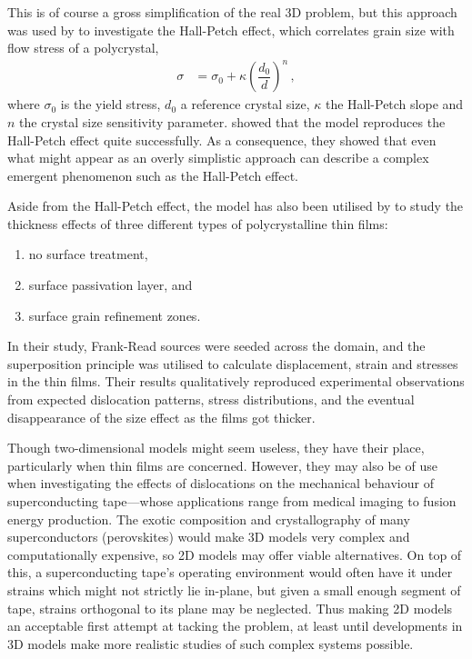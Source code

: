 This is of course a gross simplification of the real 3D problem, but this approach was used by \citet{2d_pcm} to investigate the Hall-Petch effect, which correlates grain size with flow stress of a polycrystal,
\begin{align}\label{eq:hall_petch}
  \sigma & = \sigma_{0} + \kappa \left(\dfrac{d_{0}}{d}\right)^{n}\,,
\end{align}
where $ \sigma_{0} $ is the yield stress, $ d_{0} $ a reference crystal size, $ \kappa $ the Hall-Petch slope and $ n $ the crystal size sensitivity parameter.  showed that the model reproduces the Hall-Petch effect quite successfully. As a consequence, they showed that even what might appear as an overly simplistic approach can describe a complex emergent phenomenon such as the Hall-Petch effect.

Aside from the Hall-Petch effect, the model has also been utilised by \citet{2d_pcm2} to study the thickness effects of three different types of polycrystalline thin films:
\begin{enumerate}
  \item no surface treatment,
  \item surface passivation layer, and
  \item surface grain refinement zones.
\end{enumerate}
In their study, Frank-Read sources were seeded across the domain, and the superposition principle was utilised to calculate displacement, strain and stresses in the thin films. Their results qualitatively reproduced experimental observations from expected dislocation patterns, stress distributions, and the eventual disappearance of the size effect as the films got thicker.

Though two-dimensional models might seem useless, they have their place, particularly when thin films are concerned. However, they may also be of use when investigating the effects of dislocations on the mechanical behaviour of superconducting tape---whose applications range from medical imaging to fusion energy production. The exotic composition and crystallography of many superconductors (perovskites) would make 3D models very complex and computationally expensive, so 2D models may offer viable alternatives. On top of this, a superconducting tape's operating environment would often have it under strains which might not strictly lie in-plane, but given a small enough segment of tape, strains orthogonal to its plane may be neglected. Thus making 2D models an acceptable first attempt at tacking the problem, at least until developments in 3D models make more realistic studies of such complex systems possible.

